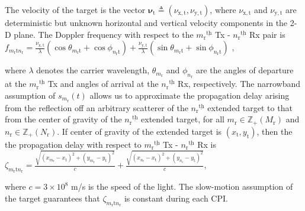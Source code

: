 \documentclass[10pt,journal]{IEEEtran}
\newcommand{\paren}[1]{\left({#1}\right)}
\newcommand{\ith}[1]    {{#1}^{\underline{\text{th}}}}
\newcommand{\rr}{_\mathrm{r}}
\newcommand{\target}{\mathrm{t}}
\theoremstyle{definition}
\begin{document}
The velocity of the target is the vector  $\boldsymbol{\nu}_{\mathrm{t}}\triangleq\left(\nu_\mathrm{\mathrm{x},\mathrm{t}},\nu_\mathrm{\mathrm{y},\mathrm{t}} \right)$, where $\nu_\mathrm{\mathrm{x},\mathrm{t}}$ and $\nu_\mathrm{\mathrm{y},\mathrm{t}}$ are deterministic but unknown horizontal and vertical velocity components in the 2-D plane. The Doppler frequency with respect to the $\ith{m\rr}$ Tx - $\ith{n\rr}$ Rx pair is $f_{m_\mathrm{r}\target n_\mathrm{r}} = \frac{\nu_\mathrm{\mathrm{x},\mathrm{t}}}{\lambda}(\cos\theta_{m_\mathrm{r}\target}+\cos\phi_{n_\mathrm{r}\target})+\frac{\nu_\mathrm{\mathrm{y},\target}}{\lambda}(\sin\theta_{m_\mathrm{r}\target}+\sin\phi_{n_\mathrm{r}\target})$ \cite{hongbin_movingtarget},

where $\lambda$ denotes the carrier wavelength, $\theta_{m_\mathrm{r}}$ and $\phi_{n_\mathrm{r}}$ are the angles of departure at the $\ith{m_\mathrm{r}}$ Tx and angles of arrival at the $\ith{n_\mathrm{r}}$ Rx, respectively. %
The narrowband assumption of $s_{m\rr}(t)$ allows us to approximate the propagation delay arising from the reflection off an arbitrary scatterer of the $\ith{n_\mathrm{r}}$ extended target to that from the center of gravity of the $\ith{n_\mathrm{r}}$ extended target, for all $m_\mathrm{r}\in\mathbb{Z}_{+}(M_\mathrm{r})$ and $n_\mathrm{r}\in\mathbb{Z}_{+}(N_\mathrm{r})$\cite{haimovich2008mimo}. If center of gravity of the extended target is $(x_{\mathrm{t}},y_{\mathrm{t}})$, then the the propagation delay with respect to $\ith{m\rr}$ Tx - $\ith{n\rr}$ Rx  is
$\zeta_{m\rr \target n\rr}=\frac{\sqrt{\paren{x_{m\rr}-x_{\mathrm{t}}}^2+\paren{y_{m\rr}-y_{\mathrm{t}}}^2}}{c}
		+\frac{\sqrt{\paren{x_{n\rr}-x_{\mathrm{t}}}^2+\paren{y_{n\rr}-y_{\mathrm{t}}}^2}}{c},$

where $c=3\times 10^8$ m/s is the speed of the light. The slow-motion assumption of the target guarantees that $\zeta_{m\rr \target n\rr }$ is constant during each CPI. %
\end{document}
